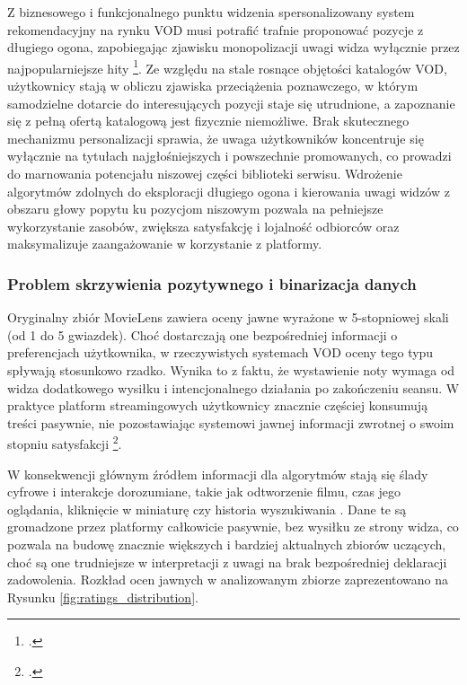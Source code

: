 Z biznesowego i funkcjonalnego punktu widzenia spersonalizowany system rekomendacyjny na rynku VOD musi potrafić trafnie proponować pozycje z długiego ogona, zapobiegając zjawisku monopolizacji uwagi widza wyłącznie przez najpopularniejsze hity \footcite{checinskiSystemyRekomendacjiRemedium2023}. Ze względu na stale rosnące objętości katalogów VOD, użytkownicy stają w obliczu zjawiska przeciążenia poznawczego, w którym samodzielne dotarcie do interesujących pozycji staje się utrudnione, a zapoznanie się z pełną ofertą katalogową jest fizycznie niemożliwe. Brak skutecznego mechanizmu personalizacji sprawia, że uwaga użytkowników koncentruje się wyłącznie na tytułach najgłośniejszych i powszechnie promowanych, co prowadzi do marnowania potencjału niszowej części biblioteki serwisu. Wdrożenie algorytmów zdolnych do eksploracji długiego ogona i kierowania uwagi widzów z obszaru głowy popytu ku pozycjom niszowym pozwala na pełniejsze wykorzystanie zasobów, zwiększa satysfakcję i lojalność odbiorców oraz maksymalizuje zaangażowanie w korzystanie z platformy.

\subsubsection{Problem skrzywienia pozytywnego i binarizacja danych} %

Oryginalny zbiór MovieLens zawiera oceny jawne wyrażone w 5-stopniowej skali (od 1 do 5 gwiazdek). Choć dostarczają one bezpośredniej informacji o preferencjach użytkownika, w rzeczywistych systemach VOD oceny tego typu spływają stosunkowo rzadko. Wynika to z faktu, że wystawienie noty wymaga od widza dodatkowego wysiłku i intencjonalnego działania po zakończeniu seansu. W praktyce platform streamingowych użytkownicy znacznie częściej konsumują treści pasywnie, nie pozostawiając systemowi jawnej informacji zwrotnej o swoim stopniu satysfakcji \footcite{rendleBPRBayesianPersonalized2009}.

W konsekwencji głównym źródłem informacji dla algorytmów stają się ślady cyfrowe i interakcje dorozumiane, takie jak odtworzenie filmu, czas jego oglądania, kliknięcie w miniaturę czy historia wyszukiwania . Dane te są gromadzone przez platformy całkowicie pasywnie, bez wysiłku ze strony widza, co pozwala na budowę znacznie większych i bardziej aktualnych zbiorów uczących, choć są one trudniejsze w interpretacji z uwagi na brak bezpośredniej deklaracji zadowolenia. Rozkład ocen jawnych w analizowanym zbiorze zaprezentowano na Rysunku \ref{fig:ratings_distribution}.

